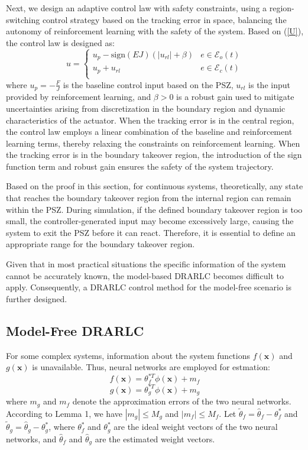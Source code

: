 \documentclass[preprint,12pt]{elsarticle}
\begin{document}
Next, we design an adaptive control law with safety constraints, using a region-switching control strategy based on the tracking error in space, balancing the autonomy of reinforcement learning with the safety of the system. Based on (\ref{U}), the control law is designed as:
\begin{equation}
    u=
    \begin{cases} \label{umb}
        u_p - \mathrm{sign}(EJ)(|u_{rl}| + \beta) & e \in \mathcal{E}_o(t)\\
        u_p + u_{rl} & e \in \mathcal{E}_c(t)\\ 
    \end{cases}
\end{equation}
where \(u_p = - \frac{F}{J}\) is the baseline control input based on the PSZ, \(u_{rl}\) is the input provided by reinforcement learning, and \(\beta > 0\) is a robust gain used to mitigate uncertainties arising from discretization in the boundary region and dynamic characteristics of the actuator. When the tracking error is in the central region, the control law employs a linear combination of the baseline and reinforcement learning terms, thereby relaxing the constraints on reinforcement learning. When the tracking error is in the boundary takeover region, the introduction of the sign function term and robust gain ensures the safety of the system trajectory.

\begin{rmk}
    Based on the proof in this section, for continuous systems, theoretically, any state that reaches the boundary takeover region from the internal region can remain within the PSZ. During simulation, if the defined boundary takeover region is too small, the controller-generated input may become excessively large, causing the system to exit the PSZ before it can react. Therefore, it is essential to define an appropriate range for the boundary takeover region.
\end{rmk}

Given that in most practical situations the specific information of the system cannot be accurately known, the model-based DRARLC becomes difficult to apply. Consequently, a DRARLC control method for the model-free scenario is further designed.

\subsection{Model-Free DRARLC}

For some complex systems, information about the system functions \(f(\mathbf{x})\) and \(g(\mathbf{x})\) is unavailable. Thus, neural networks are employed for estmation:
\[f(\mathbf{x}) = \theta^{*T}_f \phi(\mathbf{x}) + m_f\]
\[g(\mathbf{x}) = \theta^{*T}_g \phi(\mathbf{x}) + m_g\]
where \(m_g\) and \(m_f\) denote the approximation errors of the two neural networks. According to Lemma 1, we have \(|m_g| \leq M_g\) and \(|m_f| \leq M_f\). Let \(\tilde{\theta}_f = \hat{\theta}_f - \theta^*_f\) and \(\tilde{\theta}_g = \hat{\theta}_g - \theta^*_g\), where \(\theta^*_f\) and \(\theta^*_g\) are the ideal weight vectors of the two neural networks, and \(\hat{\theta}_f\) and \(\hat{\theta}_g\) are the estimated weight vectors.
\end{document}
